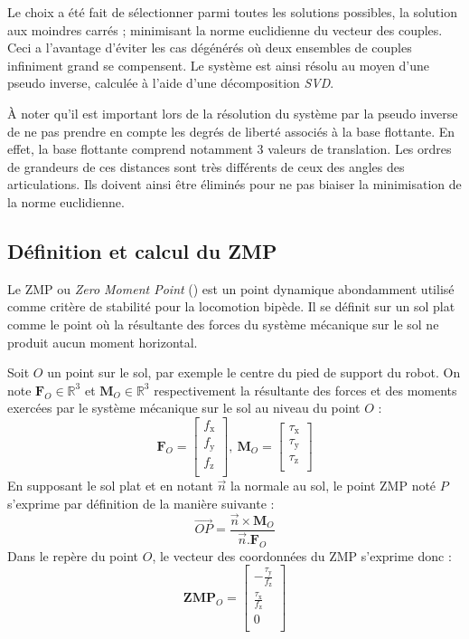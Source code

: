Le choix a été fait de sélectionner parmi toutes les solutions possibles, 
la solution aux moindres carrés ; minimisant la norme euclidienne 
du vecteur des couples. 
Ceci a l'avantage d'éviter les cas \og dégénérés \fg où deux 
ensembles de couples infiniment grand se compensent.
Le système est ainsi résolu au moyen d'une pseudo inverse,
calculée à l'aide d'une décomposition \textit{SVD}.

À noter qu'il est important lors de la résolution du système
par la pseudo inverse de ne pas prendre en compte les degrés
de liberté associés à la base flottante.
En effet, la base flottante comprend notamment $3$ valeurs de translation.
Les ordres de grandeurs de ces distances sont très différents de ceux
des angles des articulations.
Ils doivent ainsi être éliminés pour ne pas biaiser la minimisation 
de la norme euclidienne.

\subsection{Définition et calcul du ZMP\label{sec:zmp}}

Le ZMP ou \textit{Zero Moment Point} (\cite{vukobratovic_zero-moment_2004})
est un point dynamique abondamment utilisé comme critère de stabilité
pour la locomotion bipède.
Il se définit sur un sol plat comme le point où la résultante des forces 
du système mécanique sur le sol ne produit aucun moment horizontal.

Soit $O$ un point sur le sol, par exemple le centre du pied de support du robot.
On note $\bm{F}_{O} \in \mathbb{R}^{3}$ et $\bm{M}_{O} \in \mathbb{R}^{3}$
respectivement la résultante des forces et des moments exercées par le système
mécanique sur le sol au niveau du point $O$ :
$$
\bm{F}_{O} = 
\begin{bmatrix}
    f_{\text{x}} \\
    f_{\text{y}} \\
    f_{\text{z}} \\
\end{bmatrix},~
\bm{M}_{O} = 
\begin{bmatrix}
    \tau_{\text{x}} \\
    \tau_{\text{y}} \\
    \tau_{\text{z}} \\
\end{bmatrix}
$$
En supposant le sol plat et en notant $\vec{n}$ la normale au sol,
le point ZMP noté $P$ s'exprime par définition de la manière suivante : 
$$
\vec{OP} = \frac{\vec{n} \times \bm{M}_{O}}{\vec{n} . \bm{F}_{O}}
$$
Dans le repère du point $O$, le vecteur des coordonnées du ZMP
s'exprime donc : 
$$
\bm{ZMP}_{O} = 
\begin{bmatrix}
    -\frac{\tau_{\text{y}}}{f_{\text{z}}} \\
    \frac{\tau_{\text{x}}}{f_{\text{z}}} \\
    0 \\
\end{bmatrix}
$$

